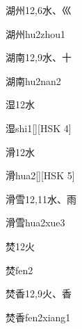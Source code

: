 \begin{entry}{湖州}{12,6}{⽔、⼮}
  \begin{phonetics}{湖州}{hu2zhou1}
  \end{phonetics}
\end{entry}

\begin{entry}{湖南}{12,9}{⽔、⼗}
  \begin{phonetics}{湖南}{hu2nan2}
  \end{phonetics}
\end{entry}

\begin{entry}{湿}{12}{⽔}
  \begin{phonetics}{湿}{shi1}[][HSK 4]
  \end{phonetics}
\end{entry}

\begin{entry}{滑}{12}{⽔}
  \begin{phonetics}{滑}{hua2}[][HSK 5]
  \end{phonetics}
\end{entry}

\begin{entry}{滑雪}{12,11}{⽔、⾬}
  \begin{phonetics}{滑雪}{hua2xue3}
  \end{phonetics}
\end{entry}

\begin{entry}{焚}{12}{⽕}
  \begin{phonetics}{焚}{fen2}
  \end{phonetics}
\end{entry}

\begin{entry}{焚香}{12,9}{⽕、⾹}
  \begin{phonetics}{焚香}{fen2xiang1}
  \end{phonetics}
\end{entry}

